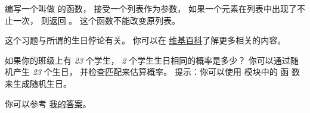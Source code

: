 \begin{exercise}
\label{duplicate}
  


编写一个叫做 {\em {}} 的函数， 接受一个列表作为参数，
如果一个元素在列表中出现了不止一次， 则返回 {\em {}} 。
这个函数不能改变原列表。

\end{exercise}


\begin{exercise}


这个习题与所谓的生日悖论有关。
你可以在 \href{http://en.wikipedia.org/wiki/Birthday_paradox}{维基百科}了解更多相关的内容。


如果你的班级上有 {\em 23} 个学生， {\em 2} 个学生生日相同的概率是多少？
你可以通过随机产生 {\em 23} 个生日， 并检查匹配来估算概率。
提示：你可以使用 {\em {}} 模块中的 {\em {}} 函
数来生成随机生日。

  
  


你可以参考 \href{http://thinkpython2.com/code/birthday.py}{我的答案}。

\end{exercise}




